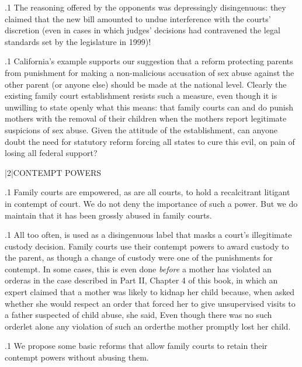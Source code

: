 \documentclass[11pt, twoside]{article}
\begin{document}
{\p.1{%
The reasoning offered by the opponents was depressingly disingenuous: they claimed that the new bill amounted to undue interference
with the courts’ discretion (even in cases in which judges’ decisions had
contravened the legal standards set by the legislature in 1999)!
}%

\p.1{%
California’s example supports our suggestion that a reform protecting parents from punishment for making a non-malicious accusation of sex abuse against the other parent (or anyone else) should
be made at the national level. Clearly the existing family court establishment resists such a measure, even though it is unwilling to
state openly what this means: that family courts can and do punish mothers with the removal of their children when the mothers report legitimate suspicions of sex abuse. Given the attitude
of the establishment, can anyone doubt the need for statutory reform forcing all states to cure this evil, on pain of losing all federal
support?
}%


\s|2|{CONTEMPT POWERS}

\p.1{%
\noindent{}Family courts are empowered, as are all courts, to hold a recalcitrant
litigant in contempt of court. We do not deny the importance of such
a power. But we do maintain that it has been grossly abused in family
courts.
}%

\p.1{%
All too often,  is used as a disingenuous label that
masks a court’s illegitimate custody decision. Family courts use their
contempt powers to award custody to the  parent, as
though a change of custody were one of the punishments for contempt.
In some cases, this is even done \textit{before} a mother has violated an order\mdash{}as
in the case described in Part II, Chapter 4 of this book, in which an expert claimed that a mother was likely to kidnap her child because, when
asked whether she would respect an order that forced her to give unsupervised visits to a father suspected of child abuse, she said,  Even though there was no such
order\mdash{}let alone any violation of such an order\mdash{}the mother promptly
lost her child.
}%

\p.1{%
We propose some basic reforms that allow family courts to retain their
contempt powers without abusing them.
}%

}
\end{document}

